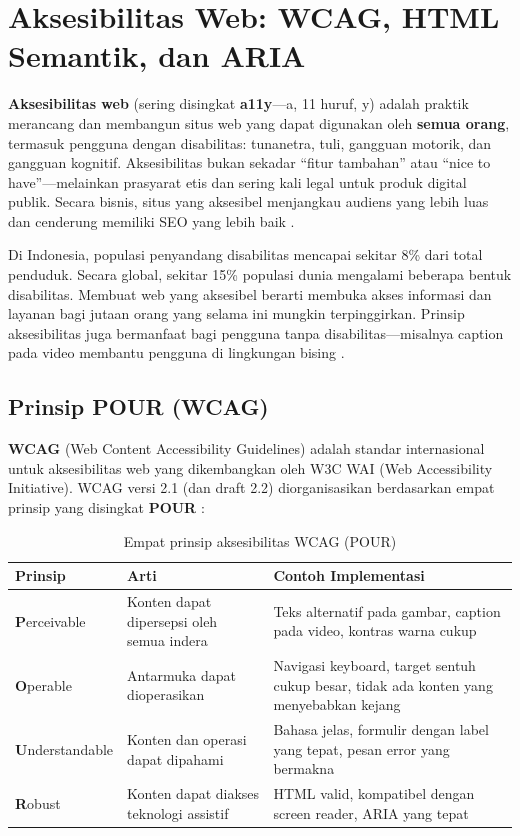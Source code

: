 \section{Aksesibilitas Web: WCAG, HTML Semantik, dan ARIA}

\textbf{Aksesibilitas web} (sering disingkat \textbf{a11y}---a, 11 huruf, y) adalah praktik merancang dan membangun situs web yang dapat digunakan oleh \textbf{semua orang}, termasuk pengguna dengan disabilitas: tunanetra, tuli, gangguan motorik, dan gangguan kognitif. Aksesibilitas bukan sekadar ``fitur tambahan'' atau ``nice to have''---melainkan prasyarat etis dan sering kali legal untuk produk digital publik. Secara bisnis, situs yang aksesibel menjangkau audiens yang lebih luas dan cenderung memiliki SEO yang lebih baik \cite{mdnAccessibility}.

Di Indonesia, populasi penyandang disabilitas mencapai sekitar 8\% dari total penduduk. Secara global, sekitar 15\% populasi dunia mengalami beberapa bentuk disabilitas. Membuat web yang aksesibel berarti membuka akses informasi dan layanan bagi jutaan orang yang selama ini mungkin terpinggirkan. Prinsip aksesibilitas juga bermanfaat bagi pengguna tanpa disabilitas---misalnya caption pada video membantu pengguna di lingkungan bising \cite{webdevAccessibility}.

\subsection{Prinsip POUR (WCAG)}

\textbf{WCAG} (Web Content Accessibility Guidelines) adalah standar internasional untuk aksesibilitas web yang dikembangkan oleh W3C WAI (Web Accessibility Initiative). WCAG versi 2.1 (dan draft 2.2) diorganisasikan berdasarkan empat prinsip yang disingkat \textbf{POUR} \cite{wcagW3c}:

\begin{table}[htbp]
\centering
\begin{tabular}{|P{2.8cm}|P{4cm}|P{5.5cm}|}
\hline
\textbf{Prinsip} & \textbf{Arti} & \textbf{Contoh Implementasi} \\
\hline
\textbf{P}erceivable & Konten dapat dipersepsi oleh semua indera & Teks alternatif pada gambar, caption pada video, kontras warna cukup \\
\hline
\textbf{O}perable & Antarmuka dapat dioperasikan & Navigasi keyboard, target sentuh cukup besar, tidak ada konten yang menyebabkan kejang \\
\hline
\textbf{U}nderstandable & Konten dan operasi dapat dipahami & Bahasa jelas, formulir dengan label yang tepat, pesan error yang bermakna \\
\hline
\textbf{R}obust & Konten dapat diakses teknologi assistif & HTML valid, kompatibel dengan screen reader, ARIA yang tepat \\
\hline
\end{tabular}
\caption{Empat prinsip aksesibilitas WCAG (POUR)}
\end{table}


